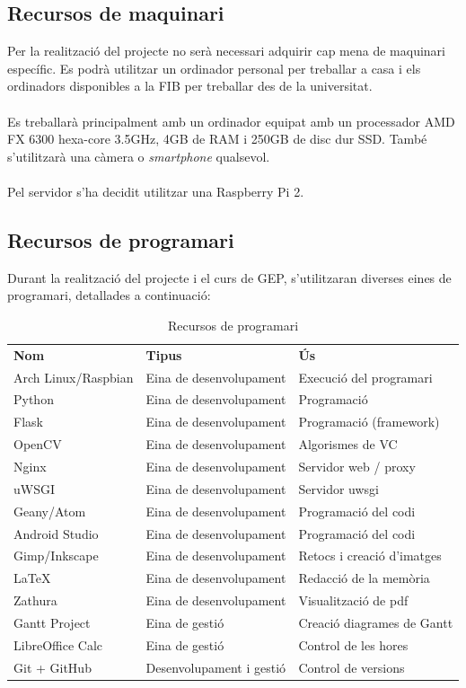 	\subsection{Recursos de maquinari}
		Per la realització del projecte no serà necessari adquirir cap mena de maquinari específic. Es podrà utilitzar un ordinador personal per treballar a casa i els ordinadors disponibles a la FIB per
		treballar des de la universitat.\\\\
		Es treballarà principalment amb un ordinador equipat amb un processador AMD FX 6300 hexa-core 3.5GHz, 4GB de RAM i 250GB de disc dur SSD. També s'utilitzarà una càmera o \textit{smartphone} qualsevol.\\\\
		Pel servidor s'ha decidit utilitzar una Raspberry Pi 2.
	\subsection{Recursos de programari}
	Durant la realització del projecte i el curs de GEP, s'utilitzaran diverses eines de programari, detallades a continuació:\\
	\begin{table}[H]
		\begin{center}
			\begin{tabular}{l !{\vrule width -1pt}p{5cm} !{\vrule width -1pt}p{5cm}}
				\textbf{Nom} & \textbf{Tipus} & \textbf{Ús} \\ %
				Arch Linux/Raspbian & Eina de desenvolupament & Execució del programari \\
				Python & Eina de desenvolupament & Programació \\
				Flask & Eina de desenvolupament & Programació (framework) \\
				OpenCV & Eina de desenvolupament & Algorismes de VC \\
				Nginx & Eina de desenvolupament & Servidor web / proxy \\
				uWSGI & Eina de desenvolupament & Servidor uwsgi \\
				Geany/Atom & Eina de desenvolupament & Programació del codi \\
				Android Studio & Eina de desenvolupament & Programació del codi \\
				Gimp/Inkscape & Eina de desenvolupament & Retocs i creació d'imatges \\
				\LaTeX & Eina de desenvolupament & Redacció de la memòria \\
				Zathura & Eina de desenvolupament & Visualització de pdf \\
				Gantt Project & Eina de gestió & Creació diagrames de Gantt \\
				LibreOffice Calc & Eina de gestió & Control de les hores \\
				Git + GitHub & Desenvolupament i gestió & Control de versions \\
			\end{tabular}
		\end{center}
		\caption{Recursos de programari}
		\label{table:programari}
	\end{table}
	
